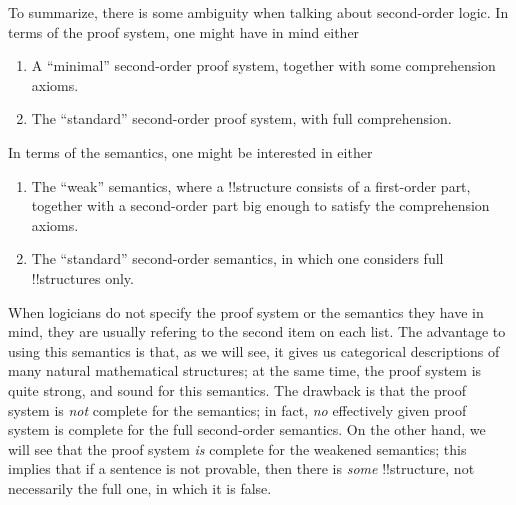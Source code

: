 \documentclass[../../../include/open-logic-section]{subfiles}
\begin{document}
To summarize, there is some ambiguity when talking about second-order
logic. In terms of the proof system, one might have in mind either
\begin{enumerate}
\item A ``minimal'' second-order proof system, together with some
  comprehension axioms.
\item The ``standard'' second-order proof system, with full
  comprehension.
\end{enumerate}
In terms of the semantics, one might be interested in either
\begin{enumerate}
\item The ``weak'' semantics, where a !!{structure} consists of a first-order
  part, together with a second-order part big enough to satisfy the
  comprehension axioms.
\item The ``standard'' second-order semantics, in which one considers
  full !!{structure}s only.
\end{enumerate}
When logicians do not specify the proof system or the semantics they
have in mind, they are usually refering to the second item on each
list. The advantage to using this semantics is that, as we will see,
it gives us categorical descriptions of many natural mathematical
structures; at the same time, the proof system is quite strong, and
sound for this semantics. The drawback is that the proof system is
\emph{not} complete for the semantics; in fact, \emph{no} effectively
given proof system is complete for the full second-order semantics. On
the other hand, we will see that the proof system \emph{is} complete
for the weakened semantics; this implies that if a sentence is not
provable, then there is \emph{some} !!{structure}, not necessarily the
full one, in which it is false.
\end{document}
